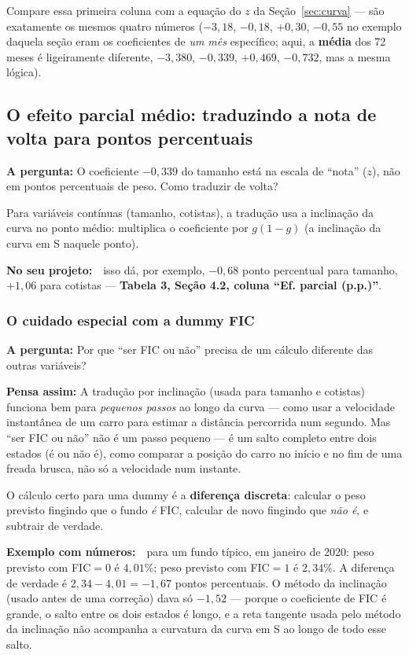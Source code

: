 \documentclass[11pt,a4paper]{article}
\newcommand{\pergunta}[1]{\par\vspace{4pt}\noindent\textbf{\color{azul}A pergunta:} #1\par\vspace{2pt}}
\newcommand{\analogia}[1]{\par\vspace{4pt}\noindent\textbf{\color{verde}Pensa assim:} #1\par\vspace{2pt}}
\newcommand{\exemplo}[0]{\par\vspace{4pt}\noindent\textbf{\color{vermelho}Exemplo com números:}\ }
\newcommand{\noprojeto}[0]{\par\vspace{4pt}\noindent\textbf{No seu projeto:}\ }
\begin{document}
Compare essa primeira coluna com a equação do $z$ da Seção~\ref{sec:curva} --- são exatamente os
mesmos quatro números ($-3{,}18$, $-0{,}18$, $+0{,}30$, $-0{,}55$ no exemplo daquela seção eram os
coeficientes de \emph{um mês} específico; aqui, a \textbf{média} dos 72 meses é ligeiramente
diferente, $-3{,}380$, $-0{,}339$, $+0{,}469$, $-0{,}732$, mas a mesma lógica).

\subsection{O efeito parcial médio: traduzindo a nota de volta para pontos percentuais}

\pergunta{O coeficiente $-0{,}339$ do tamanho está na escala de ``nota'' ($z$), não em pontos
percentuais de peso. Como traduzir de volta?}

Para variáveis contínuas (tamanho, cotistas), a tradução usa a inclinação da curva no ponto
médio: multiplica o coeficiente por $g(1-g)$ (a inclinação da curva em S naquele ponto).
\noprojeto\ isso dá, por exemplo, $-0{,}68$ ponto percentual para tamanho, $+1{,}06$ para
cotistas --- \textbf{Tabela 3, Seção 4.2, coluna ``Ef. parcial (p.p.)''}.

\subsubsection*{O cuidado especial com a dummy FIC}

\pergunta{Por que ``ser FIC ou não'' precisa de um cálculo diferente das outras variáveis?}

\analogia{A tradução por inclinação (usada para tamanho e cotistas) funciona bem para
\emph{pequenos passos} ao longo da curva --- como usar a velocidade instantânea de um carro para
estimar a distância percorrida num segundo. Mas ``ser FIC ou não'' não é um passo pequeno --- é
um salto completo entre dois estados (é ou não é), como comparar a posição do carro no início e
no fim de uma freada brusca, não só a velocidade num instante.}

O cálculo certo para uma dummy é a \textbf{diferença discreta}: calcular o peso previsto
fingindo que o fundo \emph{é} FIC, calcular de novo fingindo que \emph{não é}, e subtrair de
verdade.

\exemplo\ para um fundo típico, em janeiro de 2020: peso previsto com FIC$=0$ é $4{,}01\%$; peso
previsto com FIC$=1$ é $2{,}34\%$. A diferença de verdade é $2{,}34-4{,}01=-1{,}67$ pontos
percentuais. O método da inclinação (usado antes de uma correção) dava só $-1{,}52$ --- porque o
coeficiente de FIC é grande, o salto entre os dois estados é longo, e a reta tangente usada pelo
método da inclinação não acompanha a curvatura da curva em S ao longo de todo esse salto.
\end{document}
